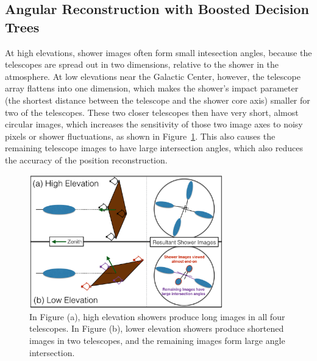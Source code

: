   \subsection{Angular Reconstruction with Boosted Decision Trees}\label{subsec:disp}
    At high elevations, shower images often form small intesection angles, because the telescopes are spread out in two dimensions, relative to the shower in the atmosphere.
    At low elevations near the Galactic Center, however, the telescope array flattens into one dimension, which makes the shower's impact parameter (the shortest distance between the telescope and the shower core axis) smaller for two of the telescopes.
    These two closer telescopes then have very short, almost circular images, which increases the sensitivity of those two image axes to noisy pixels or shower fluctuations, as shown in Figure~\ref{fig:showerhighlowelev}.
    This also causes the remaining telescope images to have large intersection angles, which also reduces the accuracy of the position reconstruction.

    \begin{figure}[ht]
      \centering
      \includegraphics[width=0.75\textwidth]{images/high_elevation_vs_low_shower_images_cropped.eps}
      \caption[Shower Images at High and Low Elevations]{
        In Figure (a), high elevation showers produce long images in all four telescopes.
        In Figure (b), lower elevation showers produce shortened images in two telescopes, and the remaining images form large angle intersection.
      }
      \label{fig:showerhighlowelev}
    \end{figure}

